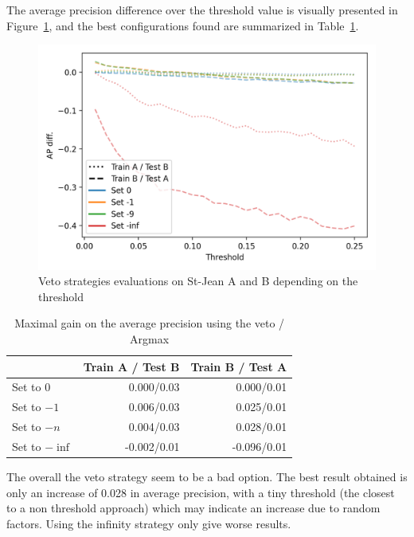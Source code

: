 The average precision difference over the threshold value is visually presented in Figure~\ref{fig:veto}, and the best configurations found are summarized in Table~\ref{tab:veto}.

\begin{figure}
  \caption{Veto strategies evaluations on St-Jean A and B depending on the threshold}
  \label{fig:veto}
  \includegraphics[width=\linewidth]{img/veto.png}
\end{figure}

\begin{table}
  \centering
  \caption{Maximal gain on the average precision using the veto / Argmax}
  \label{tab:veto}
  \begin{tabular}{l r r}
    \toprule
                   & Train A / Test B & Train B / Test A \\
    \midrule
    Set to $0$     & 0.000/0.03       & 0.000/0.01       \\
    Set to $-1$    & 0.006/0.03       & 0.025/0.01       \\
    Set to $-n$    & 0.004/0.03       & 0.028/0.01       \\
    Set to $-\inf$ & -0.002/0.01      & -0.096/0.01      \\
    \bottomrule
  \end{tabular}
\end{table}

The overall the veto strategy seem to be a bad option.
The best result obtained is only an increase of 0.028 in average precision, with a tiny threshold (the closest to a non threshold approach) which may indicate an increase due to random factors.
Using the infinity strategy only give worse results.

